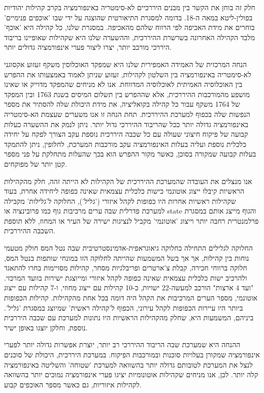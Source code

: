 חלק זה בוחן את הקשר בין מבנים היררכיים לא-סימטריה באינפורמציה בקרב קהילות יהודיות בפולין-ליטא במאה ה-18. בדומה למסגרת התיאורטית שהוצגה על ידי   שבו 'אוכפים פנימיים' בוחרים את מידת האכיפה לפי הרווח שלהם מהאכיפה. במסגרת שלנו, כל קהילה היא 'אוכף' מלבד הקהילה האחרונה בשרשרת ההיררכית, וההשערה שלנו היא שקהילות שאופיינו בריבוד היררכי מורכב יותר, יצרו ליצור פערי אינפורמציה גדולים יותר.

הנחה המרכזית של האמידה האמפירית שלנו היא שמפקד האוכלוסין משקף זעזוע אקסוגני לא-סימטריה באינפורמציה בין השלטון לקהילות, זעזוע שניתן לאמוד באמצעותו את ההפרש בין האוכלוסיה האמיתית לאוכלוסיה המדווחת. אנו לא מניחים שהמפקד מדוייק או שאינו מושפע מהמורכבות ההיררכית, אלא  שההפרש בין תשלום המיסים בשנת 1763 ובין המפקד של 1764 משקף עבור כל קהילה בקואליציה, את מידת היכולת שלה להסתיר את מספר הנפשות שלה בכפוף למערכת ההיררכית. תחת הנחה זו אנו משערים שעצמת הא-סימטריה באינפורמציה גדולה יותר ככל שהריבוד ההיררכי גדול יותר. ניתן לנמק את ההשערה כעלות קבועה של פיקוח חיצוני שעולה עם כל שכבה היררכית נוספת עקב הצורך לפקח על יחידה כלכלית נוספת ועליה בעלות האינפורמציה עקב מורכבות המערכת, לחלופין, ניתן להתמקד בעלות קבועה שמקורה בסוכן, כאשר מקור ההפרש הוא בכך שהעלות מתחלקת על פני מספר קטן יותר של מפוקחים.

אנו מנצלים את העובדה שהמערכת ההיררכית של הקהילות לא הייתה זהה, חלק מהקהילות הראשיות קיבלו ייצוג אוטונמי כישות כלכלית עצמאית שאינה כפופה ליחידה אחרת, בעוד שקהילות ראשיות אחרות היו כפופות לקהל איזורי ('גליל'),  החלוקה ל'גלילות' מקבילה למערכת פדרלית שבה ערים מרכיבות גוף כמו פרובינציה או state והגוף מייצג אותם במסגרת פרלמנטרית רחבה יותר וייצוג 'אוטונמי' מקביל לנציגות ישירה של העיר או המחוז, ללא תוספת השכבה ההיררכית. 

החלוקה לגלילים התחילה כחלוקה גיאוגראפית-אדמינסטרטיבית שבה נטל המס חולק מטעמי נוחות בין קהילות, אך אך בשל המשמעות שהייתה לחלוקה הזו במונחי שותפות בנטל המס, חלוקה ברווחי חכירה, קבלת צ'ארטרים ופריבלגיות מסחר, קהילות מסויימות בחרו להתאגד ולהרכיב ישות כלכלית עצמאית שאינה כפופה לקהל איזורי ומייוצגת ישירות בוועד המרכזי. "ועד 4 ארצות" הורכב למעשה-22 ישויות, כ-10 קהילות עם ייצוג מחוזי, ו-7 קהילות עם ייצוג אוטונמי, מספר הערים המרכיבות את הקהל היה דומה בכל אחת מהקהילות. קהילות הכפופות ביותר היו עיירות הכפופות לקהל עירוני, הכפוף ל'קהילה ראשית' שמיוצג במסגרת 'גליל'. ביניהם,  המשמעות היא, שחלק מהקהילות הראשיות היו נתונות למערכת עם שכבה היררכית נוספת, וחלקן יוצגו באופן ישיר.

ההנחה היא שמערכת שבה הריבוד ההיררכי רב יותר, יוצרת אפשרות גדולה יותר לפערי אינפורמציה שמקורן בעלויות סוכנות ובמורכבות הפיקוח. במערכת היררכית, היכולת של סוכנים לנצל את המערכת לטובותם גדולה יותר בהשוואה למערכת 'שטוחה' והשליטה באינפורמציה קלה יותר. לכן, אנו מניחים שקהילות אוטונומיות יציגו פערי אינפורמציה נמוכים יותר בהשוואה לקהילות איזוריות, גם כאשר מספר האוכפים קבוע. 